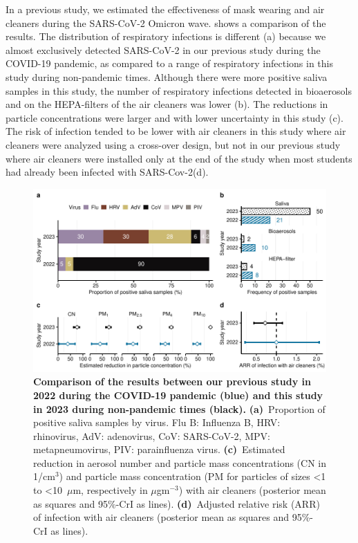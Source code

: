 \documentclass[fleqn,11pt]{wlscirep}
\begin{document}
In a previous study\cite{Banholzer2023PLoSMed}, we estimated the effectiveness of mask wearing and air cleaners during the SARS-CoV-2 Omicron wave.  shows a comparison of the results. The distribution of respiratory infections is different (a) because we almost exclusively detected SARS-CoV-2 in our previous study during the COVID-19 pandemic, as compared to a range of respiratory infections in this study during non-pandemic times. Although there were more positive saliva samples in this study, the number of respiratory infections detected in bioaerosols and on the HEPA-filters of the air cleaners was lower (b).
The reductions in particle concentrations were larger and with lower uncertainty in this study (c). The risk of infection tended to be lower with air cleaners in this study where air cleaners were analyzed using a cross-over design, but not in our previous study where air cleaners were installed only at the end of the study when most students had already been infected with SARS-Cov-2(d).

\begin{figure}[!htpb]
    \includegraphics[width=\linewidth]{../../results/comparison.pdf} 
    \caption{\textbf{Comparison of the results between our previous study in 2022 during the COVID-19 pandemic (blue) and this study in 2023 during non-pandemic times (black).} \textbf{(a)}~Proportion of positive saliva samples by virus. Flu B: Influenza B, HRV: rhinovirus, AdV: adenovirus, CoV: SARS-CoV-2, MPV: metapneumovirus, PIV: parainfluenza virus. \textbf{(c)}~Estimated reduction in aerosol number and particle mass concentrations (CN in 1/cm$^3$) and particle mass concentration (PM for particles of sizes <1 to <10~$\mu$m, respectively in $\mu$gm$^{-3}$) with air cleaners (posterior mean as squares and 95\%-CrI as lines). \textbf{(d)}~Adjusted relative risk (ARR) of infection with air cleaners (posterior mean as squares and 95\%-CrI as lines).}
    \label{fig:comparison}
\end{figure}
\end{document}
